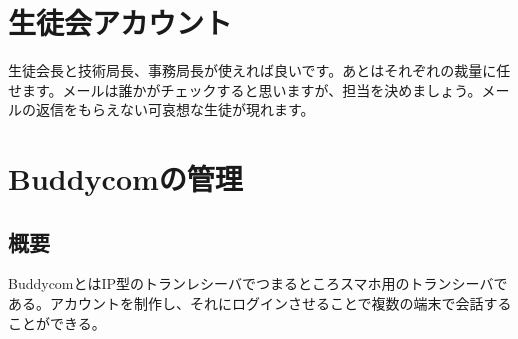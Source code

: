 \documentclass[a4paper]{ltjsreport}
\begin{document}
\section{生徒会アカウント}
生徒会長と技術局長、事務局長が使えれば良いです。あとはそれぞれの裁量に任せます。メールは誰かがチェックすると思いますが、担当を決めましょう。メールの返信をもらえない可哀想な生徒が現れます。
\section{Buddycomの管理}
\subsection{概要}
BuddycomとはIP型のトランレシーバでつまるところスマホ用のトランシーバである。アカウントを制作し、それにログインさせることで複数の端末で会話することができる。
\end{document}
